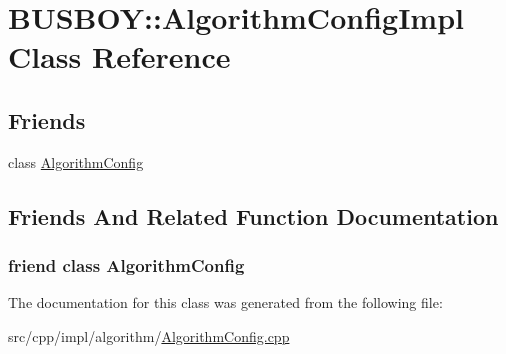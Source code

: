 \hypertarget{classBUSBOY_1_1AlgorithmConfigImpl}{
\section{BUSBOY::AlgorithmConfigImpl Class Reference}
\label{classBUSBOY_1_1AlgorithmConfigImpl}
}
\subsection*{Friends}
\begin{DoxyCompactItemize}
\item 
class \hyperlink{classBUSBOY_1_1AlgorithmConfigImpl_a006d7335200c7bbf01984a5380d90f77}{AlgorithmConfig}
\end{DoxyCompactItemize}


\subsection{Friends And Related Function Documentation}
\hypertarget{classBUSBOY_1_1AlgorithmConfigImpl_a006d7335200c7bbf01984a5380d90f77}{
\subsubsection[{AlgorithmConfig}]{\setlength{\rightskip}{0pt plus 5cm}friend class {\bf AlgorithmConfig}}}
\label{classBUSBOY_1_1AlgorithmConfigImpl_a006d7335200c7bbf01984a5380d90f77}


The documentation for this class was generated from the following file:\begin{DoxyCompactItemize}
\item 
src/cpp/impl/algorithm/\hyperlink{AlgorithmConfig_8cpp}{AlgorithmConfig.cpp}\end{DoxyCompactItemize}
